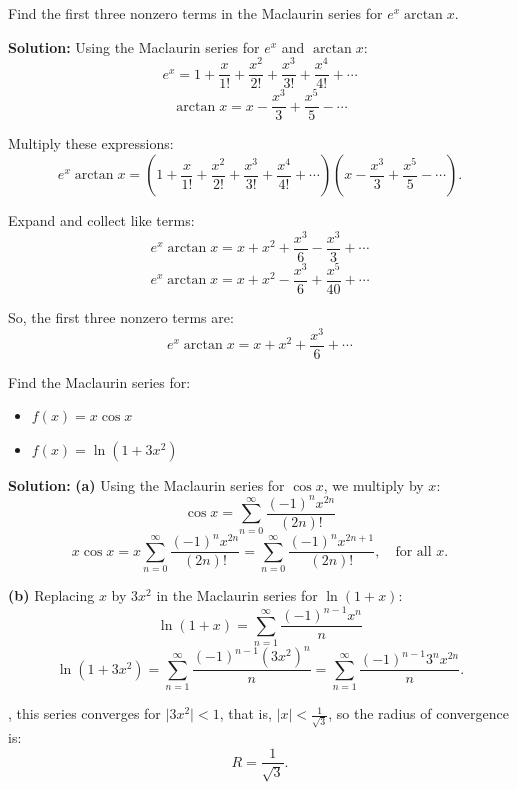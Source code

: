 \documentclass[12pt]{article}
\theoremstyle{beautifulthm}
\begin{document}
\begin{tcolorbox}[colback=examplebg, colframe=red!75!black, title=\textbf{EXAMPLE 6: Multiplication of Power Series}, fonttitle=\bfseries, sharp corners]

Find the first three nonzero terms in the Maclaurin series for $e^x \arctan x$.

\tcblower
\textbf{Solution:} 
Using the Maclaurin series for $e^x$ and $\arctan x$:
\[
e^x = 1 + \frac{x}{1!} + \frac{x^2}{2!} + \frac{x^3}{3!} + \frac{x^4}{4!} + \cdots
\]
\[
\arctan x = x - \frac{x^3}{3} + \frac{x^5}{5} - \cdots
\]

Multiply these expressions:
\[
e^x \arctan x = \left( 1 + \frac{x}{1!} + \frac{x^2}{2!} + \frac{x^3}{3!} + \frac{x^4}{4!} + \cdots \right) 
\left( x - \frac{x^3}{3} + \frac{x^5}{5} - \cdots \right).
\]

Expand and collect like terms:
\[
e^x \arctan x = x + x^2 + \frac{x^3}{6} - \frac{x^3}{3} + \cdots
\]
\[
e^x \arctan x = x + x^2 - \frac{x^3}{6} + \frac{x^5}{40} + \cdots
\]

So, the first three nonzero terms are:
\[
e^x \arctan x = x + x^2 + \frac{x^3}{6} + \cdots
\]
\end{tcolorbox}


\begin{tcolorbox}[colback=examplebg, colframe=red!75!black, title=\textbf{EXAMPLE 7:  Maclaurin Series}, fonttitle=\bfseries, sharp corners]
Find the Maclaurin series for:

\begin{itemize}
    \item[(a)] $f(x) = x \cos x$
    \item[(b)] $f(x) = \ln(1 + 3x^2)$
\end{itemize}


\tcblower
\textbf{Solution:} 
\noindent \textbf{(a)} Using the Maclaurin series for $\cos x$, we multiply by $x$:
\[
\cos x = \sum_{n=0}^\infty \frac{(-1)^n x^{2n}}{(2n)!}
\]
\[
x \cos x = x \sum_{n=0}^\infty \frac{(-1)^n x^{2n}}{(2n)!} = \sum_{n=0}^\infty \frac{(-1)^n x^{2n+1}}{(2n)!}, \quad \text{for all } x.
\]

\noindent \textbf{(b)} Replacing $x$ by $3x^2$ in the Maclaurin series for $\ln(1+x)$:
\[
\ln(1+x) = \sum_{n=1}^\infty \frac{(-1)^{n-1} x^n}{n}
\]
\[
\ln(1+3x^2) = \sum_{n=1}^\infty \frac{(-1)^{n-1} (3x^2)^n}{n} = \sum_{n=1}^\infty \frac{(-1)^{n-1} 3^n x^{2n}}{n}.
\]

\noindent, this series converges for $\lvert 3x^2 \rvert < 1$, that is, $\lvert x \rvert < \frac{1}{\sqrt{3}}$, so the radius of convergence is:
\[
R = \frac{1}{\sqrt{3}}.
\]
\end{tcolorbox}
\end{document}
